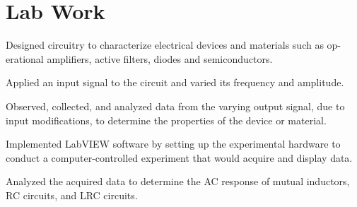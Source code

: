 \documentclass[letterpaper]{deedy-resume} %
\begin{document}
\begin{minipage}[t]{0.66\textwidth}
\sectionspace %



\sectionspace %

\section{Lab Work}

\location{    }
\begin{tightitemize}
\item Designed circuitry to characterize electrical devices and materials such as op-
erational amplifiers, active filters, diodes and semiconductors.
\item Applied an input signal to the circuit and varied its frequency and amplitude.
\item Observed, collected, and analyzed data from the varying  output signal, due to input modifications, to determine the properties of the device or material.
\end{tightitemize}

\sectionspace

\location{   }
\begin{tightitemize}
   \item Implemented LabVIEW software by setting up the experimental hardware to
conduct a computer-controlled experiment that would acquire and display data.
\item Analyzed the acquired data to determine the AC response of mutual inductors, RC circuits, and LRC circuits.
\end{tightitemize}


\end{minipage}
\end{document}
